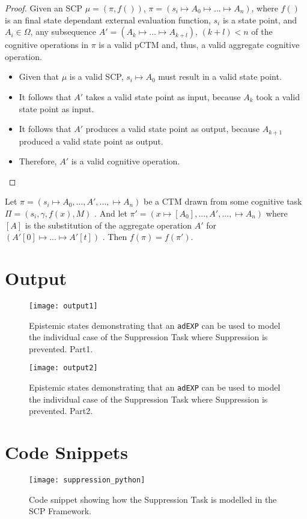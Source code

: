 \begin{proof} \label{proof:aggregateValid}
Given an SCP $\mu=(\pi,f())$, $\pi= (s_i \longmapsto A_0 \longmapsto ... \longmapsto A_n)$, where $f()$ is an final state dependant external evaluation function, $s_i$ is a state point, and $A_i \in \Omega$, any subsequence $A'=(A_k \longmapsto ... \longmapsto A_{k+l})$, $(k+l)<n$ of the cognitive operations in $\pi$ is a valid pCTM and, thus, a valid aggregate cognitive operation.
\begin{itemize}
\item Given that $\mu$ is a valid SCP, $s_i \longmapsto A_0$ must result in a valid state point.
\item It follows that $A'$ takes a valid state point as input, because $A_k$ took a valid state point as input.
\item It follows that $A'$ produces a valid state point as output, because $A_{k+1}$ produced a valid state point as output.
\item Therefore, $A'$ is a valid cognitive operation.
\end{itemize}
\end{proof}

\begin{lemma} \label{lemma:substitutionValid}
Let $\pi=(s_i\longmapsto A_0, ..., A', ..., \longmapsto A_n)$ be a CTM drawn from some cognitive task $\Pi=(s_i, \gamma, f(x), M)$ . And let $\pi'=(x\longmapsto [A_0], ..., A', ..., \longmapsto A_n)$ where $[A]$ is the substitution of the aggregate operation $A'$ for $(A'[0]\longmapsto ... \longmapsto A'[t])$ . Then $f(\pi)=f(\pi')$.
\end{lemma}



\section*{Output}
\begin{figure}
\centering \texttt{[image: output1]}
\caption{Epistemic states demonstrating that an \texttt{adEXP} can be used to model the individual case of the Suppression Task where Suppression is prevented. Part1.}
\label{fig:suppression_python}
\end{figure}
\begin{figure}
\centering \texttt{[image: output2]}
\caption{Epistemic states demonstrating that an \texttt{adEXP} can be used to model the individual case of the Suppression Task where Suppression is prevented. Part2.}
\label{fig:suppression_python}
\end{figure}

\section*{Code Snippets}
\begin{figure}
\centering \texttt{[image: suppression\_python]}
\caption{Code snippet showing how the Suppression Task is modelled in the SCP Framework.}
\label{fig:sup_snippet}
\end{figure}

